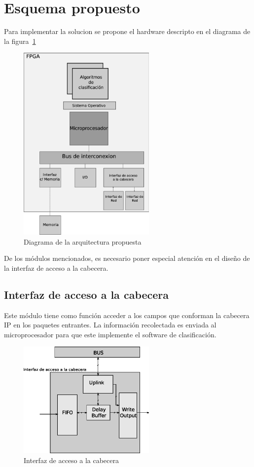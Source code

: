 \section{Esquema propuesto}
Para implementar la solucion se propone el hardware descripto en el diagrama de la figura~\ref{fig:solucion}
 \begin{figure}[h]
  \centering
	 \includegraphics[width=0.6\textwidth]{2-sistema/graf/solucion.eps}
  \caption{Diagrama de la arquitectura propuesta}
  \label{fig:solucion}
\end{figure}

De los módulos mencionados, es necesario poner especial atención en el diseño de la interfaz de acceso a la cabecera.

\subsection{Interfaz de acceso a la cabecera}
Este módulo tiene como función acceder a los campos que conforman la cabecera IP en los paquetes entrantes. La información recolectada es enviada al microprocesador para que este implemente el software de clasificación.

\newpage

 \begin{figure}[h]
  \centering
	 \includegraphics[width=0.6\textwidth]{2-sistema/graf/modulo.eps}
  \caption{Interfaz de acceso a la cabecera}
  \label{fig:inter}
\end{figure}



